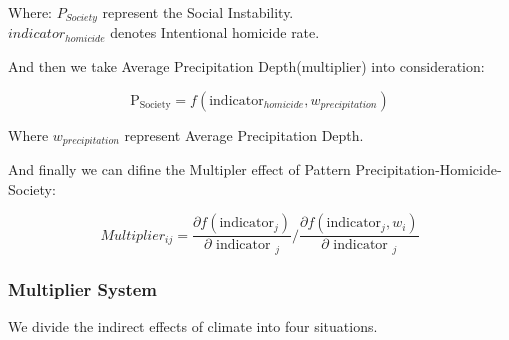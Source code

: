 \documentclass{mcmthesis}
\begin{document}
				Where:
				$P_{Society}$ represent the Social Instability.\\
				$indicator_ { homicide }$ denotes Intentional homicide rate.
				
				
				And then we take Average Precipitation Depth(multiplier) into consideration:
				
				\begin{equation}
				\mathrm { P_{Society} } = f \left( \text {indicator} _ { homicide } , w _ { precipitation } \right)
				\end{equation}
				
				Where $w _ { precipitation }$ represent Average Precipitation Depth.
				
				And finally we can difine the Multipler effect of Pattern Precipitation-Homicide-Society:
				
				\begin{equation}
				Multiplier_{ij} = \frac { \partial f \left( \text {indicator} _ { j } \right) } { \partial \text {  indicator } _ { j } } / \frac { \partial f \left( \text {indicator} _ { j } , w _ { i } \right) }  { \partial \text {  indicator } _ { j } }
				\end{equation}
				
				
				\subsubsection{Multiplier System}
				
					We divide the indirect effects of climate into four situations.
					
\end{document}
